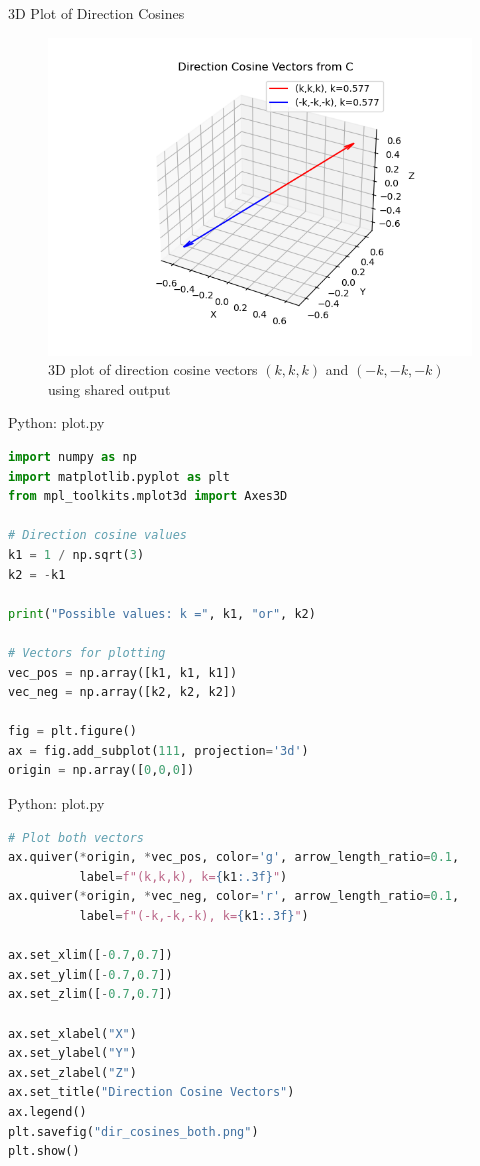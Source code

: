 \documentclass{beamer}
\numberwithin{equation}{section}
\begin{document}
\begin{frame}{3D Plot of Direction Cosines}
\begin{figure}[h!]
  \centering
  \includegraphics[width=0.6\columnwidth]{figs/Figure_1.png} 
   \caption*{3D plot of direction cosine vectors $(k,k,k)$ and $(-k,-k,-k)$ using shared output}
   \label{Fig:dircosines}
\end{figure}
\end{frame}
\begin{frame}[fragile]{Python: plot.py}
\begin{lstlisting}[language=Python]
import numpy as np
import matplotlib.pyplot as plt
from mpl_toolkits.mplot3d import Axes3D

# Direction cosine values
k1 = 1 / np.sqrt(3)
k2 = -k1

print("Possible values: k =", k1, "or", k2)

# Vectors for plotting
vec_pos = np.array([k1, k1, k1])
vec_neg = np.array([k2, k2, k2])

fig = plt.figure()
ax = fig.add_subplot(111, projection='3d')
origin = np.array([0,0,0])
\end{lstlisting}
\end{frame}
\begin{frame}[fragile]{Python: plot.py}
\begin{lstlisting}[language=Python]
# Plot both vectors
ax.quiver(*origin, *vec_pos, color='g', arrow_length_ratio=0.1,
          label=f"(k,k,k), k={k1:.3f}")
ax.quiver(*origin, *vec_neg, color='r', arrow_length_ratio=0.1,
          label=f"(-k,-k,-k), k={k1:.3f}")

ax.set_xlim([-0.7,0.7])
ax.set_ylim([-0.7,0.7])
ax.set_zlim([-0.7,0.7])

ax.set_xlabel("X")
ax.set_ylabel("Y")
ax.set_zlabel("Z")
ax.set_title("Direction Cosine Vectors")
ax.legend()
plt.savefig("dir_cosines_both.png")
plt.show()
\end{lstlisting}
\end{frame}
\end{document}
